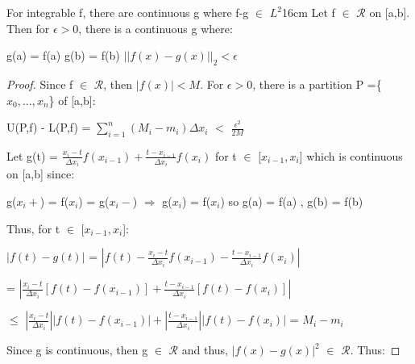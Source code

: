     \begin{wtheorem}{For integrable f, there are continuous g
    where f-g $\in$ $L^2$}{16cm}
        Let f $\in$ $\mathscr{R}$ on [a,b]. Then for $\epsilon > 0$, there is a
        continuous g where:
        
        \hspace{0.5cm}
        g(a) = f(a)
        \hspace{1cm}
        g(b) = f(b)
        \hspace{1cm}
        $||f(x)-g(x)||_2 < \epsilon$
    \end{wtheorem}

    \begin{proof}
        Since f $\in$ $\mathscr{R}$, then $|f(x)| < M$. For $\epsilon> 0$,
        there is a partition P =\{$x_0,...,x_n$\} of [a,b]:

        \hspace{0.5cm}
        U(P,f) - L(P,f)
        = $\sum_{i=1}^n (M_i - m_i)\Delta x_i$
        $<$ $\frac{\epsilon^2}{2M}$

        Let g(t) = $\frac{x_i-t}{\Delta x_i} f(x_{i-1})
                    + \frac{t-x_{i-1}}{\Delta x_i} f(x_i)$
        for t $\in$ [$x_{i-1},x_i$] which is continuous on [a,b] since:

        \hspace{0.5cm}
        g($x_i+$) = f($x_i$) = g($x_i-$)
        \hspace{1cm}
        $\Rightarrow$
        \hspace{1cm}
        g($x_i$) = f($x_i$)
        so g(a) = f(a) , g(b) = f(b)

        Thus, for t $\in$ [$x_{i-1},x_i$]:

        \hspace{0.5cm}
        $|f(t) - g(t)|$
        = $|f(t) - \frac{x_i-t}{\Delta x_i} f(x_{i-1})
            - \frac{t-x_{i-1}}{\Delta x_i} f(x_i)|$

        \hspace{0.5cm}
        = $|\frac{x_i-t}{\Delta x_i} [f(t) - f(x_{i-1})]
            + \frac{t-x_{i-1}}{\Delta x_i} [f(t) - f(x_i)]|$

        \hspace{0.5cm}
        $\leq$ $|\frac{x_i-t}{\Delta x_i}| |f(t) - f(x_{i-1})|
                + |\frac{t-x_{i-1}}{\Delta x_i}| |f(t) - f(x_i)|$
        = $M_i - m_i$

        Since g is continuous, then g $\in$ $\mathscr{R}$ and thus, $|f(x)-g(x)|^2$
        $\in$ $\mathscr{R}$. Thus:


\end{proof}
